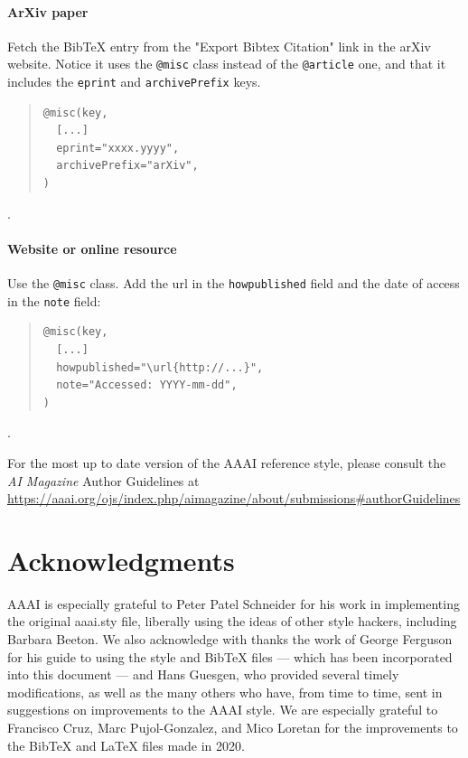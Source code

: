 \paragraph{ArXiv paper~\nocite{c:22}} Fetch the BibTeX entry from the "Export Bibtex Citation" link in the arXiv website. Notice it uses the \texttt{@misc} class instead of the \texttt{@article} one, and that it includes the \texttt{eprint} and \texttt{archivePrefix} keys.
\begin{quote}
\begin{footnotesize}
\begin{verbatim}
@misc(key,
  [...]
  eprint="xxxx.yyyy",
  archivePrefix="arXiv",
)
\end{verbatim}
\end{footnotesize}
\end{quote}
.

\paragraph{Website or online resource~\nocite{c:23}} Use the \texttt{@misc} class. Add the url in the \texttt{howpublished} field and the date of access in the \texttt{note} field:
\begin{quote}
\begin{footnotesize}
\begin{verbatim}
@misc(key,
  [...]
  howpublished="\url{http://...}",
  note="Accessed: YYYY-mm-dd",
)
\end{verbatim}
\end{footnotesize}
\end{quote}
.

\vspace{.2em}
For the most up to date version of the AAAI reference style, please consult the \textit{AI Magazine} Author Guidelines at \url{https://aaai.org/ojs/index.php/aimagazine/about/submissions#authorGuidelines}

\section{Acknowledgments}
AAAI is especially grateful to Peter Patel Schneider for his work in implementing the original aaai.sty file, liberally using the ideas of other style hackers, including Barbara Beeton. We also acknowledge with thanks the work of George Ferguson for his guide to using the style and BibTeX files --- which has been incorporated into this document --- and Hans Guesgen, who provided several timely modifications, as well as the many others who have, from time to time, sent in suggestions on improvements to the AAAI style. We are especially grateful to Francisco Cruz, Marc Pujol-Gonzalez, and Mico Loretan for the improvements to the Bib\TeX{} and \LaTeX{} files made in 2020.

